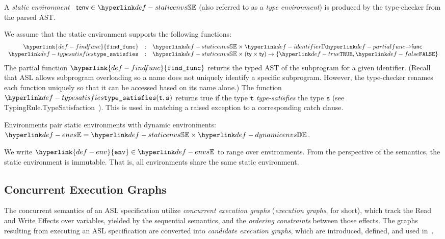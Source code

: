 \documentclass{book}
\newcommand\findfunc[0]{\hyperlink{def-findfunc}{\texttt{find\_func}}}
\newcommand\env[0]{\hyperlink{def-env}{\texttt{env}}}
\newcommand\vs[0]{\texttt{s}}
\newcommand\vt[0]{\texttt{t}}
\begin{document}
\hypertarget{def-staticenvs}{}
\begin{definition}
A \emph{static environment}~\cite{ASLTypingReference} $\tenv \in \staticenvs$ (also referred to as a \emph{type environment})
is produced by the type-checker from the parsed AST.

We assume that the static environment supports the following functions:
\hypertarget{def-findfunc}{}
\hypertarget{def-typesatisfies}{}
\[
  \begin{array}{rcl}
    \findfunc       &:& \staticenvs \times \Identifiers \partialto \func\\
    \typesat  &:& \staticenvs \times (\ty \times \ty) \rightarrow \{\True, \False\}
  \end{array}
\]
The partial function $\findfunc$ returns the typed AST of the subprogram for a given identifier.
(Recall that ASL allows subprogram overloading so a name does not uniquely identify
a specific subprogram.
However, the type-checker renames each function uniquely so that it can be accessed based
on its name alone.)
%
The function $\typesat(\vt, \vs)$ returns true
if the type $\vt$ \emph{type-satisfies} the type $\vs$
(see TypingRule.TypeSatisfaction~\cite{ASLTypingReference}).
This is used in matching a raised exception to a corresponding catch clause.
\end{definition}

\hypertarget{def-envs}{}
\begin{definition}[Environments]
Environments pair static environments with dynamic environments:
$\envs = \staticenvs \times \dynamicenvs$.
\end{definition}
\hypertarget{def-env}{}
We write $\env \in \envs$ to range over environments.
%
From the perspective of the semantics, the static environment is immutable.
That is, all environments share the same static environment.

\subsection{Concurrent Execution Graphs \label{sec:concurrentexecutiongraphs}}

The concurrent semantics of an ASL specification utilize \emph{concurrent execution graphs}
(\emph{execution graphs}, for short),
which track the Read and Write Effects over variables, yielded by the sequential semantics,
and the \emph{ordering constraints} between those effects.
The graphs resulting from executing an ASL specification are converted into
\emph{candidate execution graphs}, which are introduced, defined,
and used in~\cite{AlglaveMT14,alglave2016syntax,AlglaveDGHM21}.
\end{document}
